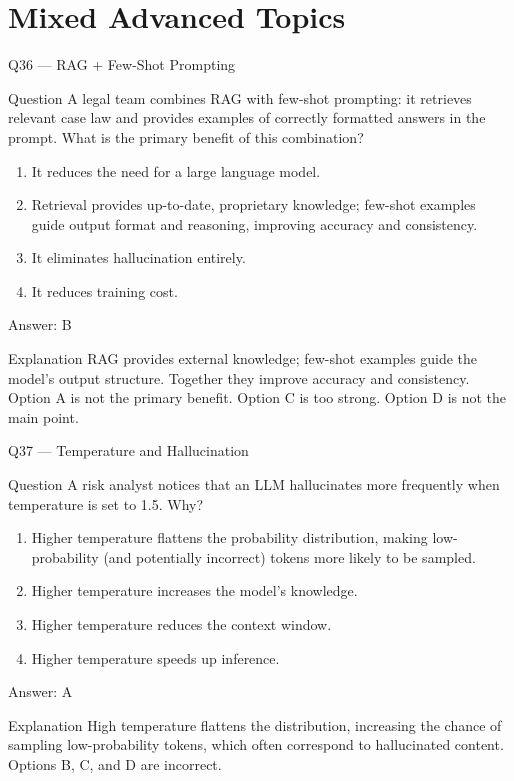 \documentclass[aspectratio=169,8pt]{beamer}
\begin{document}
	\section{Mixed Advanced Topics}
	
	\begin{frame}{Q36 --- RAG + Few-Shot Prompting}
		\begin{block}{Question}
			A legal team combines RAG with few-shot prompting: it retrieves relevant case law and provides examples of correctly formatted answers in the prompt. What is the primary benefit of this combination?
			\begin{enumerate}
				\item It reduces the need for a large language model.
				\item Retrieval provides up-to-date, proprietary knowledge; few-shot examples guide output format and reasoning, improving accuracy and consistency.
				\item It eliminates hallucination entirely.
				\item It reduces training cost.
			\end{enumerate}
		\end{block}
		\begin{exampleblock}{Answer: B}\end{exampleblock}
		\begin{block}{Explanation}
			RAG provides external knowledge; few-shot examples guide the model's output structure. Together they improve accuracy and consistency. Option A is not the primary benefit. Option C is too strong. Option D is not the main point.
		\end{block}
	\end{frame}
	
	\begin{frame}{Q37 --- Temperature and Hallucination}
		\begin{block}{Question}
			A risk analyst notices that an LLM hallucinates more frequently when temperature is set to 1.5. Why?
			\begin{enumerate}
				\item Higher temperature flattens the probability distribution, making low-probability (and potentially incorrect) tokens more likely to be sampled.
				\item Higher temperature increases the model's knowledge.
				\item Higher temperature reduces the context window.
				\item Higher temperature speeds up inference.
			\end{enumerate}
		\end{block}
		\begin{exampleblock}{Answer: A}\end{exampleblock}
		\begin{block}{Explanation}
			High temperature flattens the distribution, increasing the chance of sampling low-probability tokens, which often correspond to hallucinated content. Options B, C, and D are incorrect.
		\end{block}
	\end{frame}
	
\end{document}
